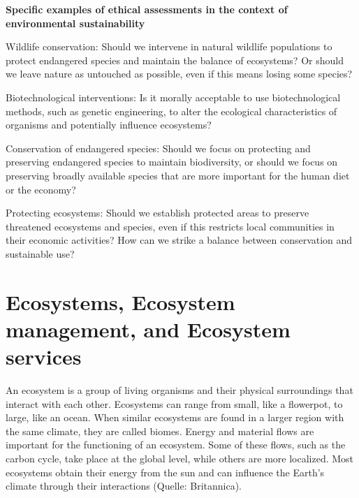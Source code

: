\documentclass[
  a4paper,
  openany]{book}
\begin{document}
\begin{tcolorbox}[enhanced jigsaw, left=2mm, arc=.35mm, titlerule=0mm, opacityback=0, leftrule=.75mm, title={Tip}, breakable, bottomtitle=1mm, rightrule=.15mm, coltitle=black, toptitle=1mm, bottomrule=.15mm, colback=white, opacitybacktitle=0.6, colbacktitle=quarto-callout-tip-color!10!white, toprule=.15mm, colframe=quarto-callout-tip-color-frame]

\textbf{Specific examples of ethical assessments in the context of
environmental sustainability}

Wildlife conservation: Should we intervene in natural wildlife
populations to protect endangered species and maintain the balance of
ecosystems? Or should we leave nature as untouched as possible, even if
this means losing some species?

Biotechnological interventions: Is it morally acceptable to use
biotechnological methods, such as genetic engineering, to alter the
ecological characteristics of organisms and potentially influence
ecosystems?

Conservation of endangered species: Should we focus on protecting and
preserving endangered species to maintain biodiversity, or should we
focus on preserving broadly available species that are more important
for the human diet or the economy?

Protecting ecosystems: Should we establish protected areas to preserve
threatened ecosystems and species, even if this restricts local
communities in their economic activities? How can we strike a balance
between conservation and sustainable use?

\end{tcolorbox}

\section{Ecosystems, Ecosystem management, and Ecosystem
services}\label{ecosystems-ecosystem-management-and-ecosystem-services}

An ecosystem is a group of living organisms and their physical
surroundings that interact with each other. Ecosystems can range from
small, like a flowerpot, to large, like an ocean. When similar
ecosystems are found in a larger region with the same climate, they are
called biomes. Energy and material flows are important for the
functioning of an ecosystem. Some of these flows, such as the carbon
cycle, take place at the global level, while others are more localized.
Most ecosystems obtain their energy from the sun and can influence the
Earth's climate through their interactions (Quelle: Britannica).
\end{document}
